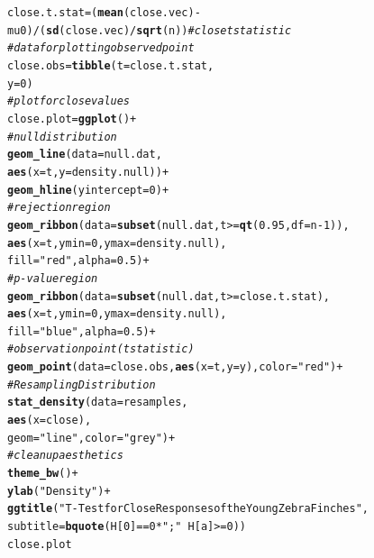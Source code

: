 \documentclass{article}\usepackage[]{graphicx}\usepackage[]{xcolor}
\makeatletter
\newcommand{\hlnum}[1]{\textcolor[rgb]{0.686,0.059,0.569}{#1}}%
\newcommand{\hlsng}[1]{\textcolor[rgb]{0.192,0.494,0.8}{#1}}%
\newcommand{\hlcom}[1]{\textcolor[rgb]{0.678,0.584,0.686}{\textit{#1}}}%
\newcommand{\hlopt}[1]{\textcolor[rgb]{0,0,0}{#1}}%
\newcommand{\hldef}[1]{\textcolor[rgb]{0.345,0.345,0.345}{#1}}%
\newcommand{\hlkwb}[1]{\textcolor[rgb]{0.69,0.353,0.396}{#1}}%
\newcommand{\hlkwc}[1]{\textcolor[rgb]{0.333,0.667,0.333}{#1}}%
\newcommand{\hlkwd}[1]{\textcolor[rgb]{0.737,0.353,0.396}{\textbf{#1}}}%
\newenvironment{kframe}{%
 \def\at@end@of@kframe{}%
 \ifinner\ifhmode%
  \def\at@end@of@kframe{\end{minipage}}%
  \begin{minipage}{\columnwidth}%
 \fi\fi%
 \def\FrameCommand##1{\hskip\@totalleftmargin \hskip-\fboxsep
 \colorbox{shadecolor}{##1}\hskip-\fboxsep
     \hskip-\linewidth \hskip-\@totalleftmargin \hskip\columnwidth}%
 \MakeFramed {\advance\hsize-\width
   \@totalleftmargin\z@ \linewidth\hsize
   \@setminipage}}%
 {\par\unskip\endMakeFramed%
 \at@end@of@kframe}
\newenvironment{knitrout}{}{} %
\makeatother
\begin{document}
\begin{enumerate}
\begin{enumerate}
\begin{knitrout}
\begin{kframe}
\begin{alltt}
\hldef{close.t.stat} \hlkwb{=} \hldef{(}\hlkwd{mean}\hldef{(close.vec)} \hlopt{-} \hldef{mu0)}\hlopt{/}\hldef{(}\hlkwd{sd}\hldef{(close.vec)}\hlopt{/}\hlkwd{sqrt}\hldef{(n))} \hlcom{#close t statistic}
\hlcom{#data for plotting observed point}
\hldef{close.obs} \hlkwb{=} \hlkwd{tibble}\hldef{(}\hlkwc{t} \hldef{= close.t.stat,}
             \hlkwc{y} \hldef{=} \hlnum{0}\hldef{)}
\hlcom{#plot for close values}
\hldef{close.plot} \hlkwb{=} \hlkwd{ggplot}\hldef{()} \hlopt{+}
  \hlcom{# null distribution}
  \hlkwd{geom_line}\hldef{(}\hlkwc{data}\hldef{=null.dat,}
            \hlkwd{aes}\hldef{(}\hlkwc{x}\hldef{=t,} \hlkwc{y}\hldef{=density.null))}\hlopt{+}
  \hlkwd{geom_hline}\hldef{(}\hlkwc{yintercept}\hldef{=}\hlnum{0}\hldef{)}\hlopt{+}
  \hlcom{# rejection region}
  \hlkwd{geom_ribbon}\hldef{(}\hlkwc{data}\hldef{=}\hlkwd{subset}\hldef{(null.dat, t}\hlopt{>=}\hlkwd{qt}\hldef{(}\hlnum{0.95}\hldef{,} \hlkwc{df}\hldef{=n}\hlopt{-}\hlnum{1}\hldef{)),}
              \hlkwd{aes}\hldef{(}\hlkwc{x}\hldef{=t,} \hlkwc{ymin}\hldef{=}\hlnum{0}\hldef{,} \hlkwc{ymax}\hldef{=density.null),}
              \hlkwc{fill}\hldef{=}\hlsng{"red"}\hldef{,} \hlkwc{alpha}\hldef{=}\hlnum{0.5}\hldef{)} \hlopt{+}
  \hlcom{#p-value region}
  \hlkwd{geom_ribbon}\hldef{(}\hlkwc{data}\hldef{=}\hlkwd{subset}\hldef{(null.dat, t}\hlopt{>=}\hldef{close.t.stat),}
              \hlkwd{aes}\hldef{(}\hlkwc{x}\hldef{=t,} \hlkwc{ymin}\hldef{=}\hlnum{0}\hldef{,} \hlkwc{ymax}\hldef{=density.null),}
              \hlkwc{fill}\hldef{=}\hlsng{"blue"}\hldef{,} \hlkwc{alpha}\hldef{=}\hlnum{0.5}\hldef{)} \hlopt{+}
  \hlcom{#observation point (t statistic)}
  \hlkwd{geom_point}\hldef{(}\hlkwc{data}\hldef{=close.obs,} \hlkwd{aes}\hldef{(}\hlkwc{x}\hldef{=t,} \hlkwc{y}\hldef{=y),} \hlkwc{color}\hldef{=}\hlsng{"red"}\hldef{)}\hlopt{+}
  \hlcom{#Resampling Distribution}
  \hlkwd{stat_density}\hldef{(}\hlkwc{data}\hldef{=resamples,}
               \hlkwd{aes}\hldef{(}\hlkwc{x}\hldef{=close),}
               \hlkwc{geom}\hldef{=}\hlsng{"line"}\hldef{,} \hlkwc{color}\hldef{=}\hlsng{"grey"}\hldef{)}\hlopt{+}
  \hlcom{#clean up aesthetics}
  \hlkwd{theme_bw}\hldef{()}\hlopt{+}
  \hlkwd{ylab}\hldef{(}\hlsng{"Density"}\hldef{)}\hlopt{+}
  \hlkwd{ggtitle}\hldef{(}\hlsng{"T-Test for Close Responses of the Young Zebra Finches"}\hldef{,}
          \hlkwc{subtitle}\hldef{=}\hlkwd{bquote}\hldef{(H[}\hlnum{0}\hldef{]}\hlopt{==}\hlnum{0}\hlopt{*}\hlsng{";"}\hlopt{~}\hldef{H[a]}\hlopt{>=}\hlnum{0}\hldef{))}
\hldef{close.plot}
\end{alltt}
\end{kframe}

\end{knitrout}
\end{enumerate}
\end{enumerate}
\end{document}
